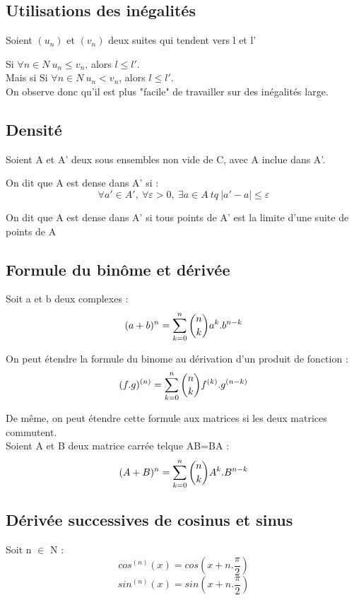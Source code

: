 \subsection{Utilisations des inégalités}
Soient $(u_n)$ et $(v_n)$ deux suites qui tendent vers l et l'
\begin{prop}
Si $\forall n \in N~ u_n \leq v_n$, alors $l \leq l'$.\\
Mais si Si $\forall n \in N~ u_n < v_n$, alors $l \leq l'$.\\
On observe donc qu'il est plus "facile" de travailler sur des inégalités large.
\end{prop}
\subsection{Densité}
Soient A et A' deux sous ensembles non vide de C, avec A inclue dans A'.\\
\begin{enon}
On dit que A est dense dans A' si :
$$\forall a' \in A',~ \forall \varepsilon > 0,~ \exists a \in A~ tq~ |a'-a| \leq \varepsilon$$
\end{enon}
\begin{prop}
On dit que A est dense dans A' si tous points de A' est la limite d'une suite de points de A
\end{prop}
\subsection{Formule du binôme et dérivée}
\begin{de}
Soit a et b deux complexes :
$$(a+b)^n = \sum_{k=0}^n \dbinom{n}{k} a^k.b^{n-k}$$
\end{de}
\begin{prop}
On peut étendre la formule du binome au dérivation d'un produit de fonction : 
$$(f.g)^{(n)} = \sum_{k=0}^n \dbinom{n}{k} f^{(k)}.g^{(n-k)}$$
\end{prop}
\begin{prop}
De même, on peut étendre cette formule aux matrices si les deux matrices commutent.\\
Soient A et B deux matrice carrée telque AB=BA : 
$$(A+B)^n = \sum_{k=0}^n \dbinom{n}{k} A^k.B^{n-k}$$
\end{prop}
\subsection{Dérivée successives de cosinus et sinus}
\begin{enon}
Soit n $\in$ N :
$$cos^{(n)}(x) = cos(x+n.\dfrac{\pi}{2})$$
$$sin^{(n)}(x) = sin(x+n.\dfrac{\pi}{2})$$
\end{enon}

